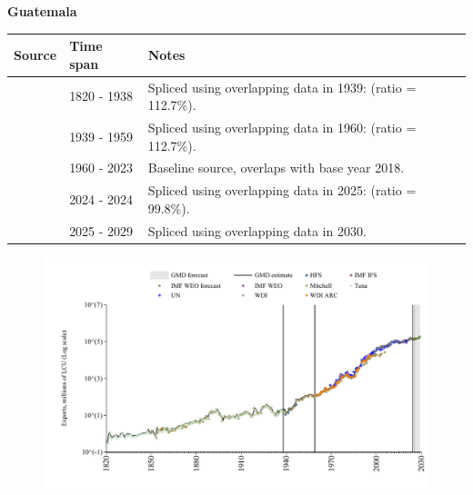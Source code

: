 \documentclass[12pt,a4paper,landscape]{article}
\begin{document}
\begin{adjustbox}{max totalsize={\paperwidth}{\paperheight},center}
\begin{minipage}[t][\textheight][t]{\textwidth}
\vspace*{0.5cm}
{}
\begin{center}
{\Large\bfseries Guatemala}
\end{center}
\vspace{0.5cm}
\begin{table}[H]
\centering
\small
\begin{tabular}{|l|l|l|}
\hline
\textbf{Source} & \textbf{Time span} & \textbf{Notes} \\
\hline
\rowcolor{white}\cite{Tena}& 1820 - 1938 &Spliced using overlapping data in 1939: (ratio = 112.7\%).\\
\rowcolor{lightgray}\cite{Mitchell}& 1939 - 1959 &Spliced using overlapping data in 1960: (ratio = 112.7\%).\\
\rowcolor{white}\cite{WDI}& 1960 - 2023 &Baseline source, overlaps with base year 2018.\\
\rowcolor{lightgray}\cite{IMF_IFS}& 2024 - 2024 &Spliced using overlapping data in 2025: (ratio = 99.8\%).\\
\rowcolor{white}\cite{IMF_WEO_forecast}& 2025 - 2029 &Spliced using overlapping data in 2030.\\
\hline
\end{tabular}
\end{table}
\begin{figure}[H]
\centering
\includegraphics[width=\textwidth,height=0.6\textheight,keepaspectratio]{graphs/GTM_exports.pdf}
\end{figure}
\end{minipage}
\end{adjustbox}
\end{document}
